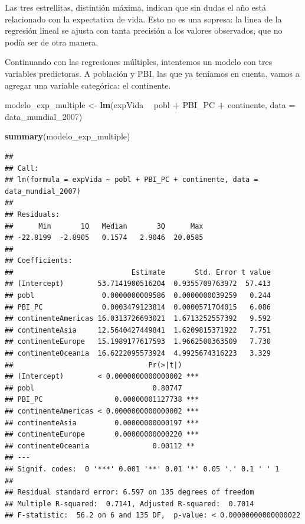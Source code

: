 \documentclass[]{book}
\newenvironment{Shaded}{\begin{snugshade}}{\end{snugshade}}
\newcommand{\KeywordTok}[1]{\textcolor[rgb]{0.13,0.29,0.53}{\textbf{#1}}}
\newcommand{\DataTypeTok}[1]{\textcolor[rgb]{0.13,0.29,0.53}{#1}}
\newcommand{\DecValTok}[1]{\textcolor[rgb]{0.00,0.00,0.81}{#1}}
\newcommand{\StringTok}[1]{\textcolor[rgb]{0.31,0.60,0.02}{#1}}
\newcommand{\OperatorTok}[1]{\textcolor[rgb]{0.81,0.36,0.00}{\textbf{#1}}}
\newcommand{\NormalTok}[1]{#1}
\begin{document}
Las tres estrellitas, distintión máxima, indican que sin dudas el año
está relacionado con la expectativa de vida. Esto no es una sopresa: la
linea de la regresión lineal se ajusta con tanta precisión a los valores
observados, que no podía ser de otra manera.

Continuando con las regresiones múltiples, intentemos un modelo con tres
variables predictoras. A población y PBI, las que ya teníamos en cuenta,
vamos a agregar una variable categórica: el continente.

\begin{Shaded}
\begin{Highlighting}[]
\NormalTok{modelo_exp_multiple <-}\StringTok{ }\KeywordTok{lm}\NormalTok{(expVida }\OperatorTok{~}\StringTok{ }\NormalTok{pobl }\OperatorTok{+}\StringTok{ }\NormalTok{PBI_PC }\OperatorTok{+}\StringTok{ }\NormalTok{continente, }\DataTypeTok{data =}\NormalTok{ data_mundial_}\DecValTok{2007}\NormalTok{)}

\KeywordTok{summary}\NormalTok{(modelo_exp_multiple)}
\end{Highlighting}
\end{Shaded}

\begin{verbatim}
## 
## Call:
## lm(formula = expVida ~ pobl + PBI_PC + continente, data = data_mundial_2007)
## 
## Residuals:
##      Min       1Q   Median       3Q      Max 
## -22.8199  -2.8905   0.1574   2.9046  20.0585 
## 
## Coefficients:
##                            Estimate       Std. Error t value
## (Intercept)        53.7141900516204  0.9355709763972  57.413
## pobl                0.0000000009586  0.0000000039259   0.244
## PBI_PC              0.0003479123814  0.0000571704015   6.086
## continenteAmericas 16.0313726693021  1.6713252557392   9.592
## continenteAsia     12.5640427449841  1.6209815371922   7.751
## continenteEurope   15.1989177617593  1.9662500363509   7.730
## continenteOceania  16.6222095573924  4.9925674316223   3.329
##                                Pr(>|t|)    
## (Intercept)        < 0.0000000000000002 ***
## pobl                            0.80747    
## PBI_PC                 0.00000001127738 ***
## continenteAmericas < 0.0000000000000002 ***
## continenteAsia         0.00000000000197 ***
## continenteEurope       0.00000000000220 ***
## continenteOceania               0.00112 ** 
## ---
## Signif. codes:  0 '***' 0.001 '**' 0.01 '*' 0.05 '.' 0.1 ' ' 1
## 
## Residual standard error: 6.597 on 135 degrees of freedom
## Multiple R-squared:  0.7141, Adjusted R-squared:  0.7014 
## F-statistic:  56.2 on 6 and 135 DF,  p-value: < 0.00000000000000022
\end{verbatim}
\end{document}
